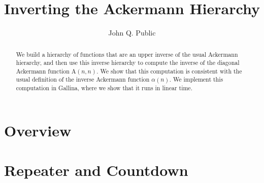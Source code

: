 \documentclass[a4paper,USenglish,cleveref, autoref]{lipics-v2019}
\title{Inverting the Ackermann Hierarchy}
\author{John Q. Public}{Dummy University Computing Laboratory, Country}{}{}{}%
\newcommand{\Ack}{\ensuremath{\text{A}}}
\theoremstyle{plain}
\theoremstyle{definition}
\begin{document}
\maketitle







\begin{abstract}
We build a hierarchy of functions that are an upper inverse
of the usual Ackermann hierarchy, and then use this inverse
hierarchy to compute the inverse of the diagonal Ackermann
function $\Ack(n, n)$. We show that this computation is
consistent with the usual definition of the inverse Ackermann
function $\alpha(n)$. We implement this computation in Gallina,
where we show that it runs in linear time.
\end{abstract}




\section{Overview}
\label{sec: overview}


\section{Repeater and Countdown}
\label{sec: countdown-repeater}

\end{document}
